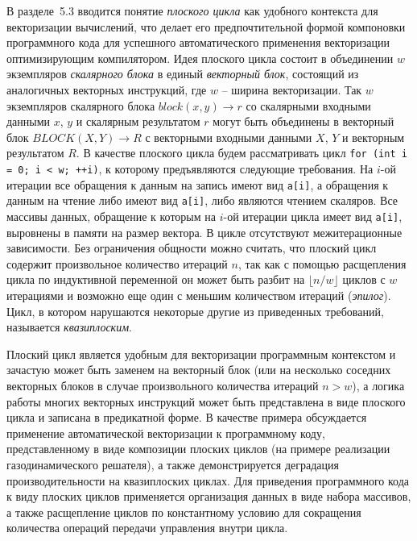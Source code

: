 \documentclass[a4paper,14pt]{extarticle}                     %
\theoremstyle{plain}                                         %
\begin{document}

В разделе~5.3 вводится понятие \textit{плоского цикла} как удобного контекста для векторизации вычислений, что делает его предпочтительной формой компоновки программного кода для успешного автоматического применения векторизации оптимизирующим компилятором.
Идея плоского цикла состоит в объединении $w$ экземпляров \textit{скалярного блока} в единый \textit{векторный блок}, состоящий из аналогичных векторных инструкций, где $w$ -- ширина векторизации.
Так $w$ экземпляров скалярного блока $block(x, y) \rightarrow r$ со скалярными входными данными $x$, $y$ и скалярным результатом $r$ могут быть объединены в векторный блок $BLOCK(X, Y) \rightarrow R$ с векторными входными данными $X$, $Y$ и векторным результатом $R$.
В качестве плоского цикла будем рассматривать цикл \texttt{for (int i = 0; i < w; ++i)}, к которому предъявляются следующие требования.
На $i$-ой итерации все обращения к данным на запись имеют вид \texttt{a[i]}, а обращения к данным на чтение либо имеют вид \texttt{a[i]}, либо являются чтением скаляров.
Все массивы данных, обращение к которым на $i$-ой итерации цикла имеет вид \texttt{a[i]}, выровнены в памяти на размер вектора.
В цикле отсутствуют межитерационные зависимости.
Без ограничения общности можно считать, что плоский цикл содержит произвольное количество итераций $n$, так как с помощью расщепления цикла по индуктивной переменной он может быть разбит на $\lfloor n/w \rfloor$ циклов с $w$ итерациями и возможно еще один с меньшим количеством итераций (\textit{эпилог}).
Цикл, в котором нарушаются некоторые другие из приведенных требований, называется \textit{квазиплоским}.


Плоский цикл является удобным для векторизации программным контекстом и зачастую может быть заменем на векторный блок (или на несколько соседних векторных блоков в случае произвольного количества итераций $n > w$), а логика работы многих векторных инструкций может быть представлена в виде плоского цикла и записана в предикатной форме.
В качестве примера обсуждается применение автоматической векторизации к программному коду, представленному в виде композиции плоских циклов (на примере реализации газодинамического решателя), а также демонстрируется деградация производительности на квазиплоских циклах.
Для приведения программного кода к виду плоских циклов применяется организация данных в виде набора массивов, а также расщепление циклов по константному условию для сокращения количества операций передачи управления внутри цикла.
\end{document}
